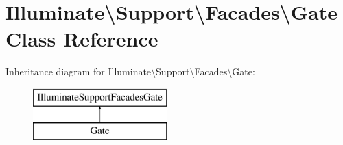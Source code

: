 \hypertarget{class_illuminate_1_1_support_1_1_facades_1_1_gate}{}\section{Illuminate\textbackslash{}Support\textbackslash{}Facades\textbackslash{}Gate Class Reference}
\label{class_illuminate_1_1_support_1_1_facades_1_1_gate}
Inheritance diagram for Illuminate\textbackslash{}Support\textbackslash{}Facades\textbackslash{}Gate\+:\begin{figure}[H]
\begin{center}
\leavevmode
\includegraphics[height=2.000000cm]{class_illuminate_1_1_support_1_1_facades_1_1_gate}
\end{center}
\end{figure}
